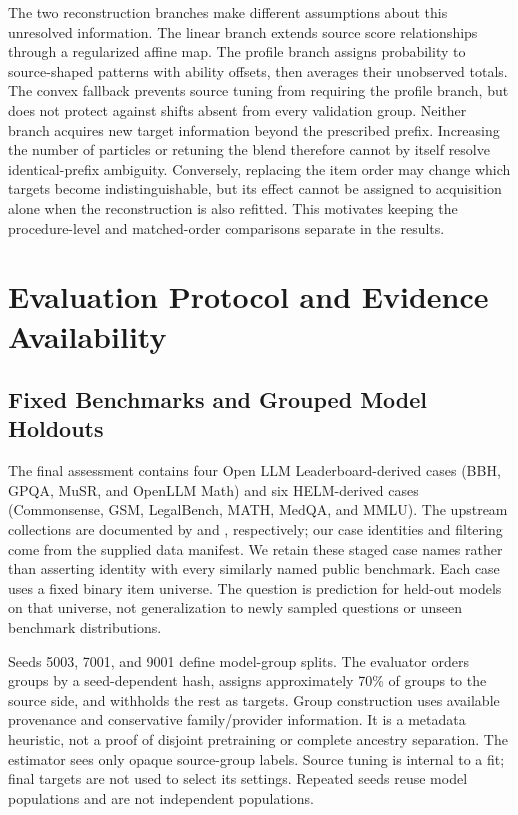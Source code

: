 \documentclass{article}
\begin{document}
The two reconstruction branches make different assumptions about this unresolved information. The linear branch extends source score relationships through a regularized affine map. The profile branch assigns probability to source-shaped patterns with ability offsets, then averages their unobserved totals. The convex fallback prevents source tuning from requiring the profile branch, but does not protect against shifts absent from every validation group. Neither branch acquires new target information beyond the prescribed prefix. Increasing the number of particles or retuning the blend therefore cannot by itself resolve identical-prefix ambiguity. Conversely, replacing the item order may change which targets become indistinguishable, but its effect cannot be assigned to acquisition alone when the reconstruction is also refitted. This motivates keeping the procedure-level and matched-order comparisons separate in the results.

\section{Evaluation Protocol and Evidence Availability}
\subsection{Fixed Benchmarks and Grouped Model Holdouts}
The final assessment contains four Open LLM Leaderboard-derived cases (BBH, GPQA, MuSR, and OpenLLM Math) and six HELM-derived cases (Commonsense, GSM, LegalBench, MATH, MedQA, and MMLU). The upstream collections are documented by \citet{OpenLLMLeaderboard} and \citet{Liang2023}, respectively; our case identities and filtering come from the supplied data manifest. We retain these staged case names rather than asserting identity with every similarly named public benchmark. Each case uses a fixed binary item universe. The question is prediction for held-out models on that universe, not generalization to newly sampled questions or unseen benchmark distributions.

Seeds 5003, 7001, and 9001 define model-group splits. The evaluator orders groups by a seed-dependent hash, assigns approximately 70\% of groups to the source side, and withholds the rest as targets. Group construction uses available provenance and conservative family/provider information. It is a metadata heuristic, not a proof of disjoint pretraining or complete ancestry separation. The estimator sees only opaque source-group labels. Source tuning is internal to a fit; final targets are not used to select its settings. Repeated seeds reuse model populations and are not independent populations.
\end{document}
